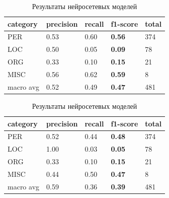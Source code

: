 \hfill
\begin{table}[h!]
\begin{subtable}[h]{0.4\textwidth}

\begin{tabular}{| l | l | l | l | l |}
\hline

 category &precision  &  recall & \textbf{f1-score} &  total\\
\hline
PER &  0.53 & 0.60 & \textbf{0.56} &  374 \\ 
\hline
LOC &  0.50 & 0.05 & \textbf{0.09} &   78 \\ 
\hline
ORG &  0.33 & 0.10 & \textbf{0.15} &   21 \\
\hline
MISC &  0.56 & 0.62 & \textbf{0.59} &   8 \\
\hline
\hline

 macro avg &  0.52 & 0.49 & \textbf{0.47} &  481 \\
\hline
\end{tabular}

\caption{Результаты модели BERT}
\end{subtable}

\hfill

\begin{subtable}[h]{0.4\textwidth}

\begin{tabular}{| l | l | l | l | l |}
\hline

 category &precision  &  recall & \textbf{f1-score} &  total\\
\hline
PER &  0.52 & 0.44 & \textbf{0.48} &  374 \\ 
\hline
LOC &  1.00 & 0.03 & \textbf{0.05} &   78 \\ 
\hline
ORG &  0.33 & 0.10 & \textbf{0.15} &   21 \\
\hline
MISC &  0.44 & 0.50 & \textbf{0.47} &   8 \\
\hline
\hline

 macro avg &  0.59 & 0.36 & \textbf{0.39} &  481 \\
\hline


\end{tabular}

\caption{Результаты модели Bi-LSTM-CRF}
\end{subtable}

\caption{Результаты нейросетевых моделей}
\label{t}
\end{table}


